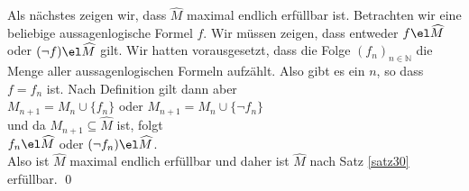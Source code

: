 \begin{enumerate}
  Als nächstes zeigen wir, dass $\widehat{M}$ maximal endlich erfüllbar ist.  Betrachten wir eine
  beliebige aussagenlogische Formel $f$.  Wir müssen zeigen, dass entweder $f \el \widehat{M}$ oder 
  $(\neg f) \el \widehat{M}$ gilt.  Wir hatten vorausgesetzt, dass die Folge $(f_n)_{n \in \mathbb{N}}$ 
  die Menge aller aussagenlogischen Formeln aufzählt.  Also gibt es ein $n$, so dass $f = f_n$ ist.
  Nach Definition gilt dann aber 
  \\[0.2cm]
  \hspace*{1.3cm}
  $M_{n+1} = M_n \cup \{ f_n \}$ \quad oder \quad 
  $M_{n+1} = M_n \cup \{ \neg f_n \}$
  \\[0.2cm]
  und da $M_{n+1} \subseteq \widehat{M}$ ist, folgt
  \\[0.2cm]
  \hspace*{1.3cm}
  $f_n \el \widehat{M}$ \quad oder \quad
  $(\neg f_n) \el \widehat{M}$.
  \\[0.2cm]
  Also ist $\widehat{M}$ maximal endlich erfüllbar und daher ist $\widehat{M}$ nach Satz \ref{satz30} erfüllbar. \qed
\end{enumerate}


